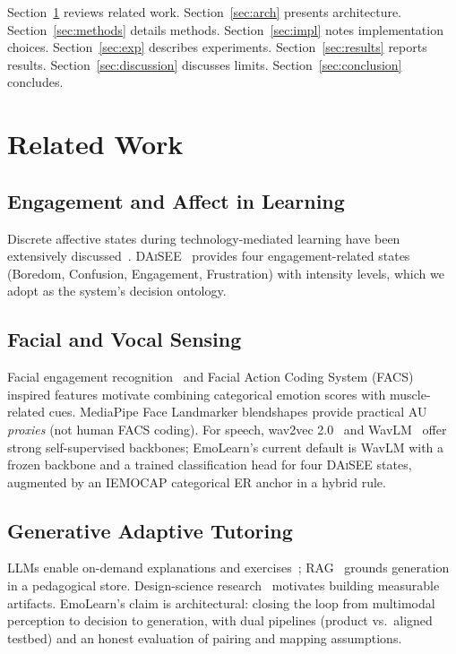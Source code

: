 \documentclass[conference]{IEEEtran}
\begin{document}
Section~\ref{sec:related} reviews related work. Section~\ref{sec:arch}
presents architecture. Section~\ref{sec:methods} details methods.
Section~\ref{sec:impl} notes implementation choices. Section~\ref{sec:exp}
describes experiments. Section~\ref{sec:results} reports results.
Section~\ref{sec:discussion} discusses limits. Section~\ref{sec:conclusion}
concludes.

\section{Related Work}
\label{sec:related}

\subsection{Engagement and Affect in Learning}
Discrete affective states during technology-mediated learning have been
extensively discussed~\cite{dmello2015review,pekrun2006control,dmello2012dynamics,baker2010better}.
\textsc{DAiSEE}~\cite{gupta2016daisee} provides four engagement-related states
(Boredom, Confusion, Engagement, Frustration) with intensity levels, which we
adopt as the system's decision ontology.

\subsection{Facial and Vocal Sensing}
Facial engagement recognition~\cite{whitehill2014faces} and Facial Action
Coding System (FACS) inspired features motivate combining categorical emotion
scores with muscle-related cues. MediaPipe Face Landmarker blendshapes provide
practical AU \emph{proxies} (not human FACS coding). For speech, wav2vec
2.0~\cite{baevski2020wav2vec2} and WavLM~\cite{chen2022wavlm} offer strong
self-supervised backbones; EmoLearn's current default is WavLM with a frozen
backbone and a trained classification head for four \textsc{DAiSEE} states,
augmented by an IEMOCAP categorical ER anchor in a hybrid rule.

\subsection{Generative Adaptive Tutoring}
LLMs enable on-demand explanations and exercises~\cite{kasneci2023chatgpt};
RAG~\cite{lewis2020retrieval} grounds generation in a pedagogical store.
Design-science research~\cite{hevner2004design} motivates building measurable
artifacts. EmoLearn's claim is architectural: closing the loop from multimodal
perception to decision to generation, with dual pipelines (product vs.\ aligned
testbed) and an honest evaluation of pairing and mapping assumptions.
\end{document}
